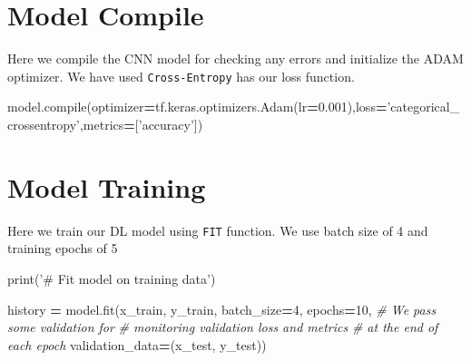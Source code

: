 \documentclass[]{book}
\newenvironment{Shaded}{\begin{snugshade}}{\end{snugshade}}
\newcommand{\BuiltInTok}[1]{#1}
\newcommand{\CommentTok}[1]{\textcolor[rgb]{0.56,0.35,0.01}{\textit{#1}}}
\newcommand{\DecValTok}[1]{\textcolor[rgb]{0.00,0.00,0.81}{#1}}
\newcommand{\FloatTok}[1]{\textcolor[rgb]{0.00,0.00,0.81}{#1}}
\newcommand{\NormalTok}[1]{#1}
\newcommand{\OperatorTok}[1]{\textcolor[rgb]{0.81,0.36,0.00}{\textbf{#1}}}
\newcommand{\StringTok}[1]{\textcolor[rgb]{0.31,0.60,0.02}{#1}}
\begin{document}
\hypertarget{model-compile}{%
\section{Model Compile}\label{model-compile}}

Here we compile the CNN model for checking any errors and initialize the ADAM optimizer. We have used \texttt{Cross-Entropy} has our loss function.

\begin{Shaded}
\begin{Highlighting}[]
\NormalTok{model.}\BuiltInTok{compile}\NormalTok{(optimizer}\OperatorTok{=}\NormalTok{tf.keras.optimizers.Adam(lr}\OperatorTok{=}\FloatTok{0.001}\NormalTok{),loss}\OperatorTok{=}\StringTok{'categorical_crossentropy'}\NormalTok{,metrics}\OperatorTok{=}\NormalTok{[}\StringTok{'accuracy'}\NormalTok{])}
\end{Highlighting}
\end{Shaded}

\hypertarget{model-training}{%
\section{Model Training}\label{model-training}}

Here we train our DL model using \texttt{FIT} function. We use batch size of 4 and training epochs of 5

\begin{Shaded}
\begin{Highlighting}[]
\BuiltInTok{print}\NormalTok{(}\StringTok{'# Fit model on training data'}\NormalTok{)}
\end{Highlighting}
\end{Shaded}

\begin{Shaded}
\begin{Highlighting}[]
\NormalTok{history }\OperatorTok{=}\NormalTok{ model.fit(x_train, y_train,}
\NormalTok{                    batch_size}\OperatorTok{=}\DecValTok{4}\NormalTok{,}
\NormalTok{                    epochs}\OperatorTok{=}\DecValTok{10}\NormalTok{,}
                    \CommentTok{# We pass some validation for}
                    \CommentTok{# monitoring validation loss and metrics}
                    \CommentTok{# at the end of each epoch}
\NormalTok{                    validation_data}\OperatorTok{=}\NormalTok{(x_test, y_test))}
                    
\end{Highlighting}
\end{Shaded}
\end{document}
